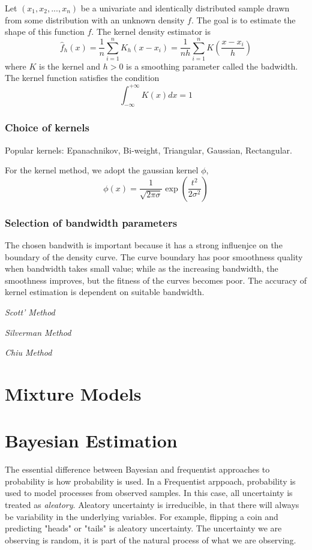 \subsubsection{}
Let $(x_1,x_2,...,x_n)$ be a univariate and identically distributed sample drawn from some distribution with an unknown density $f$.
The goal is to estimate the shape of this function $f$.  The kernel density estimator is
\begin{equation}
  \hat{f}_h(x)=\frac{1}{n}\sum_{i=1}^{n}K_h(x-x_i)
    =\frac{1}{nh}\sum_{i=1}^{n}K\left(\frac{x-x_i}{h}\right)
\end{equation}
where $K$ is the kernel and $h>0$ is a smoothing parameter called the badwidth.  The kernel function satisfies the condition
\begin{equation}
  \int_{-\infty}^{+\infty}K(x)dx=1
\end{equation}
\subsubsection{Choice of kernels}
Popular kernels: Epanachnikov, Bi-weight, Triangular, Gaussian, Rectangular.

For the kernel method, we adopt the gaussian kernel $\phi$,
\begin{equation}
  \phi(x)=\frac{1}{\sqrt{2\pi\sigma}}\exp{\left(\frac{t^2}{2\sigma^2}\right)}
\end{equation}
\subsubsection{Selection of bandwidth parameters}
The chosen bandwith is important because it has a strong influenjce on the boundary of the density curve.  The curve boundary has poor smoothness quality when bandwidth takes small value; while as the increasing bandwidth, the smoothness improves, but the fitness of the curves becomes poor.  The accuracy of kernel estimation is dependent on suitable bandwidth.

\emph{Scott' Method}

\emph{Silverman Method}

\emph{Chiu Method}

\section{Mixture Models}

\section{Bayesian Estimation}
The essential difference between Bayesian and frequentist approaches to probability is how probability is used.  In a Frequentist arppoach, probability is used to model processes from observed samples.  In this case, all uncertainty is treated as \emph{aleatory}.  Aleatory uncertainty is irreducible, in that there will always be variability in the underlying variables.  For example, flipping a coin and predicting "heads" or "tails" is aleatory uncertainty.  The uncertainty we are observing is random, it is part of the natural process of what we are observing.

